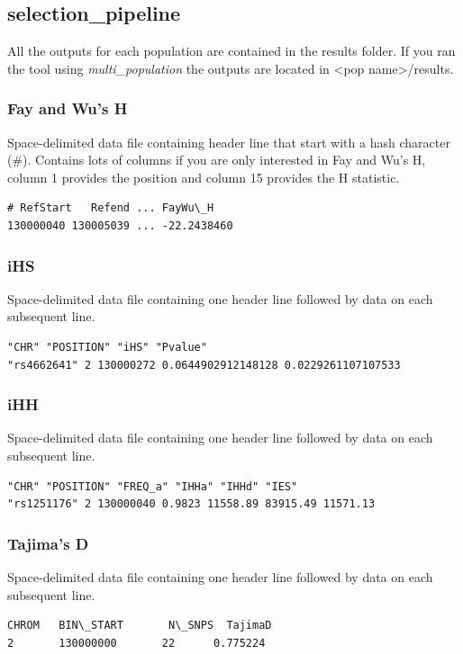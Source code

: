 \documentclass[a4paper,10pt]{article}
\begin{document}
\subsection{selection\_pipeline}
All the outputs for each population are contained in the results folder. If you ran the tool using \emph{multi\_population} the outputs are located in <pop name>/results. 
\subsubsection{Fay and Wu's H}
Space-delimited data file containing header line that start with a hash character (\#). Contains lots of columns if you are only interested in Fay and Wu's H, column 1 provides the position and column 15 provides the H statistic. \\
\begin{verbatim}
# RefStart   Refend ... FayWu\_H
130000040 130005039 ... -22.2438460
\end{verbatim}
\subsubsection{iHS}
Space-delimited data file containing one header line followed by data on each subsequent line.\\
\begin{verbatim}
"CHR" "POSITION" "iHS" "Pvalue"
"rs4662641" 2 130000272 0.0644902912148128 0.0229261107107533
\end{verbatim}
\subsubsection{iHH}
Space-delimited data file containing one header line followed by data on each subsequent line.\\
\begin{verbatim}
"CHR" "POSITION" "FREQ_a" "IHHa" "IHHd" "IES"
"rs1251176" 2 130000040 0.9823 11558.89 83915.49 11571.13
\end{verbatim}
\subsubsection{Tajima's D}
Space-delimited data file containing one header line followed by data on each subsequent line.\\
\begin{verbatim}
CHROM   BIN\_START       N\_SNPS  TajimaD
2       130000000       22      0.775224
\end{verbatim}
\end{document}
